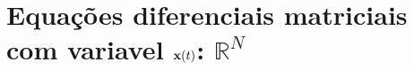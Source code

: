 
\chapter{Equações diferenciais matriciais com variavel $\VECTOR{x}(t)$: $\mathbb{R}^{N}$}



\newpage


\newpage


